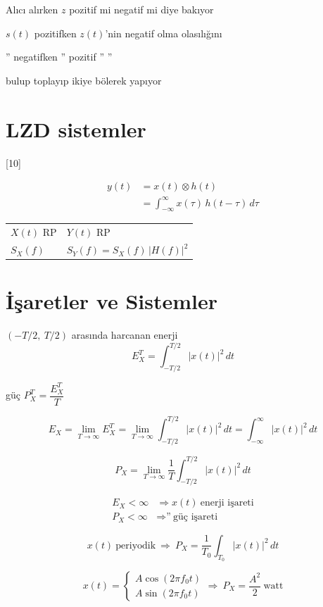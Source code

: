 \documentclass[11pt,a4paper]{article}
\begin{document}
Alıcı alırken $z$ pozitif mi negatif mi diye bakıyor

$s(t)$ pozitifken \quad $z(t)$'nin negatif olma olasılığını

'' \quad negatifken \quad '' \quad pozitif \quad '' \quad ''

bulup toplayıp ikiye bölerek yapıyor

\section{LZD sistemler}

[10]

\begin{align*}
y(t) &= x(t)\otimes h(t)\\
&= \int_{-\infty}^{\infty} x(\tau)\,h(t-\tau)\,d\tau
\end{align*}

\begin{tabular}{@{}p{}l@{}}
$X(t)$ RP & $Y(t)$ RP\\[4pt]
$S_X(f)$ & $S_Y(f)=S_X(f)\,|H(f)|^2$
\end{tabular}

\section{İşaretler ve Sistemler}

$(-T/2,\ T/2)$ arasında harcanan enerji
\[ E_X^T=\int_{-T/2}^{T/2}|x(t)|^2\,dt \]

güç \quad $P_X^T=\dfrac{E_X^T}{T}$

\[ E_X=\lim_{T\to\infty} E_X^T=\lim_{T\to\infty}\int_{-T/2}^{T/2}|x(t)|^2\,dt=\int_{-\infty}^{\infty}|x(t)|^2\,dt \]

\[ P_X=\lim_{T\to\infty}\frac{1}{T}\int_{-T/2}^{T/2}|x(t)|^2\,dt \]

\begin{align*}
E_X<\infty &\Rightarrow x(t)\ \text{enerji işareti}\\
P_X<\infty &\Rightarrow \text{''}\ \text{güç işareti}
\end{align*}

\[ x(t)\ \text{periyodik}\ \Rightarrow\ P_X=\frac{1}{T_0}\int_{T_0}|x(t)|^2\,dt \]

\[ x(t)=\begin{cases}A\cos(2\pi f_0 t)\\ A\sin(2\pi f_0 t)\end{cases}\Rightarrow\ P_X=\frac{A^2}{2}\ \text{watt} \]
\end{document}
